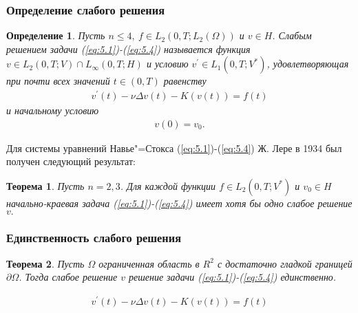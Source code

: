 \documentclass[10pt, pdf, hyperref={unicode}]{beamer}
\newtheorem{ru_theo}{Теорема}
\renewenvironment{theorem}{\begin{ru_theo}}{\end{ru_theo}}
\newtheorem{ru_def}{Определение}
\renewenvironment{definition}{\begin{ru_def}}{\end{ru_def}}
\begin{document}
  \begin{frame}
    \frametitle{Определение слабого решения}
    \begin{center}
      \begin{minipage}[h]{0.97\linewidth}
        \begin{definition}
          Пусть $n \le 4, \ f \in L_2(0, T; L_2(\Omega))$ и $v \in H$. Слабым решением задачи (\ref{eq:5.1})-(\ref{eq:5.4}) называется функция
          $v \in L_2(0, T; V)\cap L_{\infty}(0,T;H)$ и условию $ v^{\prime}\in L_1(0, T; V^\ast)$,
          удовлетворяющая при почти всех значений $t \in (0, T)$ равенству 
          \begin{equation}\label{eq:5.11}
              \begin{gathered}
                v^\prime(t) - \nu\Delta v(t) - K(v(t)) = f(t)
              \end{gathered}
          \end{equation}
          и начальному условию
          \begin{equation}\label{eq:5.12}
              \begin{gathered}
                v(0) = v_0.
              \end{gathered}
          \end{equation}
        \end{definition}
        Для системы уравнений Навье"=Стокса (\ref{eq:5.1})-(\ref{eq:5.4}) Ж. Лере в 1934 был получен следующий результат:
        \begin{theorem}
          Пусть $n=2,3$. Для каждой функции $f\in L_2(0,T;V^\ast)$ и $v_0\in H$ начально-краевая задача (\ref{eq:5.1})-(\ref{eq:5.4})
          имеет хотя бы одно слабое решение $v.$
        \end{theorem}
      \end{minipage}
    \end{center}
  \end{frame}


    \begin{frame}
    \frametitle{Единственность слабого решения}
    \begin{center}
      \begin{minipage}[h]{0.97\linewidth}
        \begin{theorem}
          Пусть $\Omega$ ограниченная область в $R^2$ с достаточно гладкой границей $\partial\Omega$. Тогда слабое решение $v$  решение
          задачи (\ref{eq:5.1})-(\ref{eq:5.4}) единственно.
        \end{theorem}
        \begin{equation}\label{eq:5.11}
        \begin{gathered}
            v^\prime(t) - \nu\Delta v(t) - K(v(t)) = f(t)
        \end{gathered}
    \end{equation}
      \end{minipage}
    \end{center}
  \end{frame}
\end{document}
